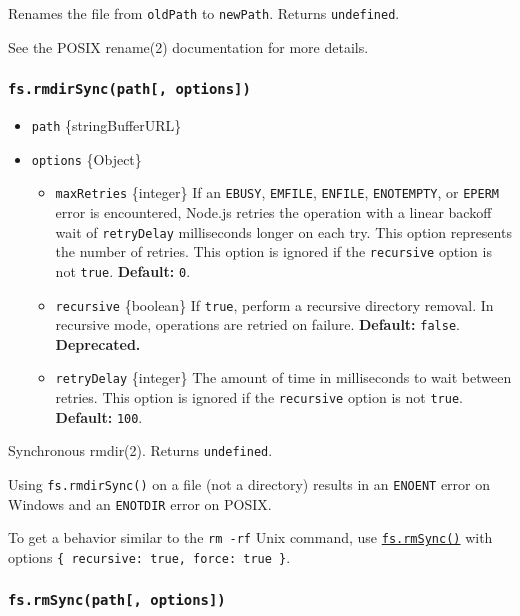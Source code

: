 Renames the file from \texttt{oldPath} to \texttt{newPath}. Returns
\texttt{undefined}.

See the POSIX rename(2) documentation for more details.

\subsubsection{\texorpdfstring{\texttt{fs.rmdirSync(path{[},\ options{]})}}{fs.rmdirSync(path{[}, options{]})}}\label{fs.rmdirsyncpath-options}

\begin{itemize}
\tightlist
\item
  \texttt{path} \{string\textbar Buffer\textbar URL\}
\item
  \texttt{options} \{Object\}

  \begin{itemize}
  \tightlist
  \item
    \texttt{maxRetries} \{integer\} If an \texttt{EBUSY},
    \texttt{EMFILE}, \texttt{ENFILE}, \texttt{ENOTEMPTY}, or
    \texttt{EPERM} error is encountered, Node.js retries the operation
    with a linear backoff wait of \texttt{retryDelay} milliseconds
    longer on each try. This option represents the number of retries.
    This option is ignored if the \texttt{recursive} option is not
    \texttt{true}. \textbf{Default:} \texttt{0}.
  \item
    \texttt{recursive} \{boolean\} If \texttt{true}, perform a recursive
    directory removal. In recursive mode, operations are retried on
    failure. \textbf{Default:} \texttt{false}. \textbf{Deprecated.}
  \item
    \texttt{retryDelay} \{integer\} The amount of time in milliseconds
    to wait between retries. This option is ignored if the
    \texttt{recursive} option is not \texttt{true}. \textbf{Default:}
    \texttt{100}.
  \end{itemize}
\end{itemize}

Synchronous rmdir(2). Returns \texttt{undefined}.

Using \texttt{fs.rmdirSync()} on a file (not a directory) results in an
\texttt{ENOENT} error on Windows and an \texttt{ENOTDIR} error on POSIX.

To get a behavior similar to the \texttt{rm\ -rf} Unix command, use
\hyperref[fsrmsyncpath-options]{\texttt{fs.rmSync()}} with options
\texttt{\{\ recursive:\ true,\ force:\ true\ \}}.

\subsubsection{\texorpdfstring{\texttt{fs.rmSync(path{[},\ options{]})}}{fs.rmSync(path{[}, options{]})}}\label{fs.rmsyncpath-options}

